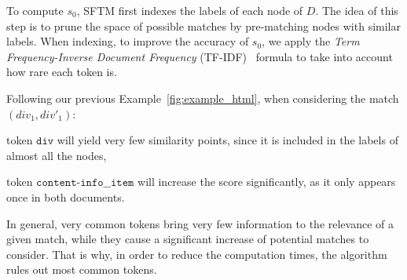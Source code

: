 To compute $s_0$, SFTM first indexes the labels of each node of $D$.
The idea of this step is to prune the space of possible matches by pre-matching nodes with similar labels.
When indexing, to improve the accuracy of $s_0$, we apply the \emph{Term Frequency-Inverse Document Frequency} (TF-IDF)~\cite{jones1972statistical} formula to take into account how rare each token is.
\begin{ex}
    Following our previous Example~\ref{fig:example_html}, when considering the match $(div_1, div'_1)$:
    \begin{compactenum}
        \item token $\texttt{div}$ will yield very few similarity points, since it is included in the labels of almost all the nodes,
        \item token $\texttt{content-info\_\_item}$ will increase the score significantly, as it only appears once in both documents.
    \end{compactenum}
\end{ex}

In general, very common tokens bring very few information to the relevance of a given match, while they cause a significant increase of potential matches to consider.
That is why, in order to reduce the computation times, the algorithm rules out most common tokens.

